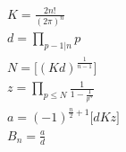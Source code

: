 \documentclass{standalone}
\renewenvironment{gather*}{$\gathered}{\endgathered$}
\begin{document}
\begin{gather*}
    K = \frac{2n!}{(2\pi)^n}\\[3ex]
    d = \prod_{p-1|n} p\\[3ex]
    N = \big[(Kd)^{\frac{1}{n-1}}\big]\\[3ex]
    z = \prod_{p \leqslant N} \frac{1}{1-\frac{1}{p^n}}\\[3ex]
    a = (-1)^{\frac{n}{2}+1}\big[dKz\big]\\[3ex]
    B_n = \frac{a}{d}
\end{gather*}
\end{document}
